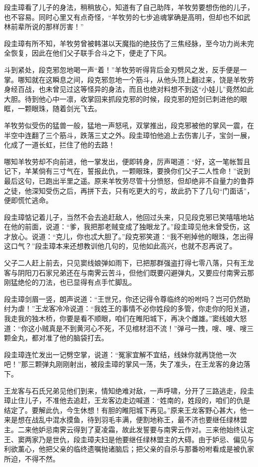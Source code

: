 \documentclass[12pt,oneside]{book}
\begin{document}
段圭璋看了儿子的身法，稍稍放心，知道有了自己助阵，羊牧劳要想伤他的儿子，也不容易。同时心里又有点奇怪，``羊牧劳的七步追魂掌确是高明，但却也不如武林前辈所说的那样厉害！''

段圭璋有所不知，羊牧劳曾被韩湛以天魔指的绝技伤了三焦经脉，至今功力尚未完全恢复，因此在他们父子联手合斗之下，便走了下风。

斗到紧处，段克邪忽地喝一声``着！''羊牧劳听得背后金刃劈风之发，反手便是一掌。哪知就在这瞬息之间，段克邪忽地一个筋斗，从他头顶上翻过来，饶是羊牧劳身经百战，也未曾见过这等怪异的身法，而且也绝对料想不到这``小娃儿''竟然如此大胆。待到他心中一凛，收掌回来抓段克邪的时候，段克邪的短剑已刺进他的眼眶，一颗眼珠，随着剑光飞去。

羊牧劳似受伤的猛兽一般，猛地一声怒吼，双掌推出，段克邪被他的掌风一震，在半空中连翻了三个筋斗，跌落三丈之外。段圭璋怕他追上去伤害儿子，宝剑一展，化成了一道长虹，拦住了他的去路！

哪知羊牧劳却不向前进，他一掌发出，便即转身，厉声喝道：``好，这一笔帐暂且记下，羊某倘有三寸气在，誓报此仇，一颗眼珠，要换你们父子二人性命！''说到最后这句，已跑出半里之遥。原来羊牧劳尽管十分愤怒，但却绝非不自量力的鲁莽之徒，他深知受伤之后，再拼下去，只有吃更大的亏，故此扔下了几句``门面话''，便即慌忙逃命。

段圭璋惦记着儿子，当然不会去追赶敌人，他回过头来，只见段克邪已笑嘻嘻地站在他的前面，说道：``爹，我把那老贼变成了独眼龙了。''段圭璋见他未曾受伤，这才放心。说道：``克儿，你也忒大胆了。''段克邪笑道：``我不剜掉他的眼珠，怎出得这口气？''段圭璋本来还想教训他几句的，见他如此高兴，也就不忍再说了。

父子二人赶上前去，只见窦线娘弹如雨下，已把那群强盗打得七零八落，只有王龙客与阴阳刀石家兄弟还在与南霁云苦斗，但他们既要闪避弹丸，又要应付南霁云那刚猛绝伦的刀法，也已显得有点手忙脚乱。

段圭璋剑眉一竖，朗声说道：``王世兄，你还记得令尊临终的吩咐吗？岂可仍然助纣为虐！''王龙客冷冷说道：``我姓王的事情不必你姓段的多管，你走你的阳关道，我走我的独木桥，你要是看不顺眼，咱们在睢阳城下，再决个雌雄。''窦线娘大怒道：``你这小贼真是不到黄河心不死，不见棺材泪不流！''弹弓一拽，嗖、嗖、嗖三颗金丸，都对准了他的脑袋打去。

段圭璋连忙发出一记劈空掌，说道：``冤家宜解不宜结，线妹你就再饶他一次吧！''那三颗弹丸刚刚射出，被段圭璋的掌风一荡，失了准头，在王龙客的身边落下。

王龙客与石氏兄弟见他们到来，情知绝难对敌，一声呼啸，分开了三路逃走，段圭璋止住儿子，不准他去追赶，王龙客边走边喊道：``姓南的，姓段的，咱们的仇是结定了。要解此仇，今生休想！有胆的睢阳城下再见。''原来王龙客野心甚大，他一来是想在战乱中混水摸鱼，待到羽毛丰满，便割地称王，最不济也要继任绿林盟主。二来他妒忌南霁云得到了夏凌霜，故此发誓要与南霁云作对。三来他始终认定王、窦两家乃是世仇，段圭璋夫妇是他要继任绿林盟主的大碍。由于妒忌、偏见与利欲薰心，他把父亲的临终遗嘱抛诸脑后；把父亲的自杀与那番吩咐看成是被仇家所迫，不得不然。
\end{document}
